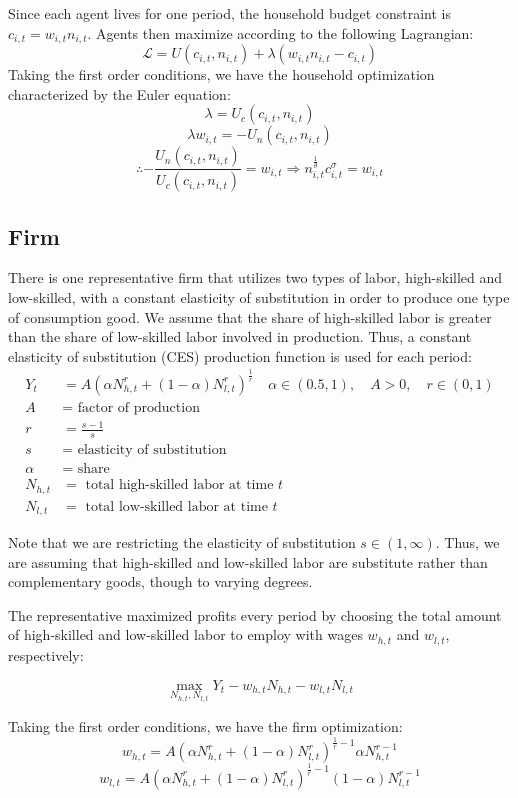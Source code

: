 \documentclass[11pt]{article}
\begin{document}
  Since each agent lives for one period, the household budget constraint is $ c_{i,t} = w_{i,t} n_{i,t}$. Agents then maximize according to the following Lagrangian:
  $$ \mathscr{L} = U(c_{i,t}, n_{i,t}) + \lambda(w_{i,t} n_{i,t}-c_{i,t})$$
  Taking the first order conditions, we have the household optimization characterized by the Euler equation:
  $$\lambda = U_c(c_{i,t}, n_{i,t})$$
  $$\lambda w_{i,t}= -U_n(c_{i,t}, n_{i,t})$$
  $$\therefore -\frac{U_n(c_{i,t}, n_{i,t})}{U_c(c_{i,t}, n_{i,t})} = w_{i,t} \Rightarrow  n_{i,t}^{\frac{1}{\theta}} c_{i,t}^\sigma= w_{i,t}$$

  \subsection{Firm}
  There is one representative firm that utilizes two types of labor, high-skilled and low-skilled, with a constant elasticity of substitution in order to produce one type of consumption good. We assume that the share of high-skilled labor is greater than the share of low-skilled labor involved in production. Thus, a constant elasticity of substitution (CES) production function is used for each period:
  \begin{align*}
      Y_t &= A(\alpha N_{h,t}^r + (1-\alpha) N_{l,t}^r )^{\frac{1}{r}} \quad \alpha \in (0.5,1), \quad A>0, \quad r \in (0,1)\\
      A &= \text{ factor of production} \\
      r &= \frac{s-1}{s} \\
      s &= \text{ elasticity of substitution} \\
      \alpha &= \text{ share} \\
      N_{h,t} &= \text{ total high-skilled labor at time } t  \\
      N_{l,t} &= \text{ total low-skilled labor at time } t
  \end{align*}

  Note that we are restricting the elasticity of substitution $s\in(1,\infty)$. Thus, we are assuming that high-skilled and low-skilled labor are substitute rather than complementary goods, though to varying degrees.

  The representative maximized profits every period by choosing the total amount of high-skilled and low-skilled labor to employ with wages $w_{h,t}$ and $w_{l,t}$, respectively:

  $$\max_{N_{h,t},N_{l,t}} Y_t - w_{h,t} N_{h,t} - w_{l,t} N_{l,t}$$

  Taking the first order conditions, we have the firm optimization:
  $$w_{h,t} = A(\alpha N_{h,t}^r + (1-\alpha) N_{l,t}^r )^{\frac{1}{r}-1} \alpha N_{h,t}^{r-1} $$
  $$w_{l,t} = A(\alpha N_{h,t}^r + (1-\alpha) N_{l,t}^r )^{\frac{1}{r}-1} (1-\alpha) N_{l,t}^{r-1} $$
\end{document}

